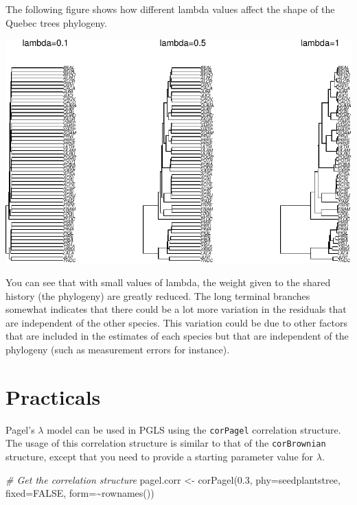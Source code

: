 \documentclass[
]{book}
\newenvironment{Shaded}{\begin{snugshade}}{\end{snugshade}}
\newcommand{\AttributeTok}[1]{\textcolor[rgb]{0.77,0.63,0.00}{#1}}
\newcommand{\CommentTok}[1]{\textcolor[rgb]{0.56,0.35,0.01}{\textit{#1}}}
\newcommand{\ConstantTok}[1]{\textcolor[rgb]{0.00,0.00,0.00}{#1}}
\newcommand{\FloatTok}[1]{\textcolor[rgb]{0.00,0.00,0.81}{#1}}
\newcommand{\FunctionTok}[1]{\textcolor[rgb]{0.00,0.00,0.00}{#1}}
\newcommand{\NormalTok}[1]{#1}
\newcommand{\OtherTok}[1]{\textcolor[rgb]{0.56,0.35,0.01}{#1}}
\newcommand{\SpecialCharTok}[1]{\textcolor[rgb]{0.00,0.00,0.00}{#1}}
\begin{document}
The following figure shows how different lambda values affect the shape of the Quebec trees phylogeny.

\begin{center}\includegraphics{pcm-workshop_files/figure-latex/alpha example-1} \end{center}

You can see that with small values of lambda, the weight given to the shared history (the phylogeny) are greatly reduced. The long terminal branches somewhat indicates that there could be a lot more variation in the residuals that are independent of the other species. This variation could be due to other factors that are included in the estimates of each species but that are independent of the phylogeny (such as measurement errors for instance).

\hypertarget{practicals-1}{%
\section{Practicals}\label{practicals-1}}

Pagel's \(\lambda\) model can be used in PGLS using the \texttt{corPagel} correlation structure. The usage of this correlation structure is similar to that of the \texttt{corBrownian} structure, except that you need to provide a starting parameter value for \(\lambda\).

\begin{Shaded}
\begin{Highlighting}[]
\CommentTok{\# Get the correlation structure}
\NormalTok{pagel.corr }\OtherTok{\textless{}{-}} \FunctionTok{corPagel}\NormalTok{(}\FloatTok{0.3}\NormalTok{, }\AttributeTok{phy=}\NormalTok{seedplantstree, }\AttributeTok{fixed=}\ConstantTok{FALSE}\NormalTok{, }\AttributeTok{form=}\SpecialCharTok{\textasciitilde{}}\FunctionTok{rownames}\NormalTok{())}
\end{Highlighting}
\end{Shaded}
\end{document}
